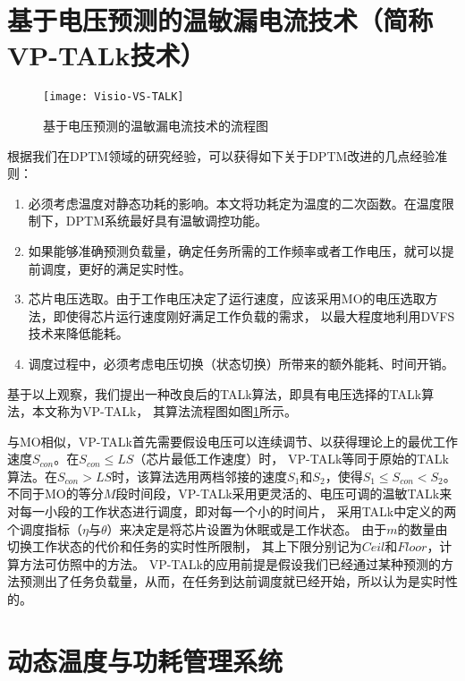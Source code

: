 \section{基于电压预测的温敏漏电流技术（简称VP-TALk技术）}
\begin{figure}[H] %
  \centering
  \texttt{[image: Visio-VS-TALK]}
  \caption{基于电压预测的温敏漏电流技术的流程图}
  \label{fig:vp-talk}
\end{figure}
\label{sec:vp-talk}
根据我们在DPTM领域的研究经验，可以获得如下关于DPTM改进的几点经验准则：
\begin{enumerate}[1)]
\item 必须考虑温度对静态功耗的影响。本文将功耗定为温度的二次函数。在温度限制下，DPTM系统最好具有温敏调控功能。
\item 如果能够准确预测负载量，确定任务所需的工作频率或者工作电压，就可以提前调度，更好的满足实时性。
\item 芯片电压选取。由于工作电压决定了运行速度，应该采用MO的电压选取方法，即使得芯片运行速度刚好满足工作负载的需求， 以最大程度地利用DVFS技术来降低能耗。
\item 调度过程中，必须考虑电压切换（状态切换）所带来的额外能耗、时间开销。
\end{enumerate}

基于以上观察，我们提出一种改良后的TALk算法，即具有电压选择的TALk算法，本文称为VP-TALk， 其算法流程图如图\ref{fig:vp-talk}所示。

与MO相似，VP-TALk首先需要假设电压可以连续调节、以获得理论上的最优工作速度$S_{con}$。在$S_{con}\leq LS$（芯片最低工作速度）时， VP-TALk等同于原始的TALk算法。在$S_{con}>{LS}$时，该算法选用两档邻接的速度$S_1$和$S_2$，使得$S_1\leq S_{con}<S_2$。 不同于MO的等分$M$段时间段，VP-TALk采用更灵活的、电压可调的温敏TALk来对每一小段的工作状态进行调度，即对每一个小的时间片， 采用TALk中定义的两个调度指标（$\eta$与$\theta$）来决定是将芯片设置为休眠或是工作状态。 由于$m$的数量由切换工作状态的代价和任务的实时性所限制， 其上下限分别记为$Ceil$和$Floor$，计算方法可仿照中的方法。 VP-TALk的应用前提是假设我们已经通过某种预测的方法预测出了任务负载量，从而，在任务到达前调度就已经开始，所以认为是实时性的。

\section{动态温度与功耗管理系统}
\label{DPTM-system}
